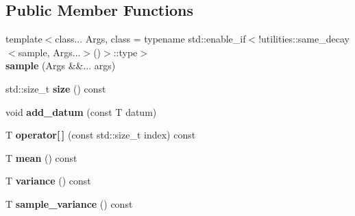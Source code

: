 \subsection*{Public Member Functions}
\begin{DoxyCompactItemize}
\item 
\mbox{\label{classsequoia_1_1statistics_1_1sample_3_01_t_00_010_01_4_a80c955beb3d1ac71708dd6588981c5a5}} 
{\footnotesize template$<$class... Args, class  = typename std\+::enable\+\_\+if$<$!utilities\+::same\+\_\+decay$<$sample, Args...$>$()$>$\+::type$>$ }\\{\bfseries sample} (Args \&\&... args)
\item 
\mbox{\label{classsequoia_1_1statistics_1_1sample_3_01_t_00_010_01_4_acaeb64b7c6ee90ea49c0515072277697}} 
std\+::size\+\_\+t {\bfseries size} () const
\item 
\mbox{\label{classsequoia_1_1statistics_1_1sample_3_01_t_00_010_01_4_ae31378f773e17c3745f0fb9e6da8f81a}} 
void {\bfseries add\+\_\+datum} (const T datum)
\item 
\mbox{\label{classsequoia_1_1statistics_1_1sample_3_01_t_00_010_01_4_ab6986245fd308b49515442391fabc7f2}} 
T {\bfseries operator\mbox{[}$\,$\mbox{]}} (const std\+::size\+\_\+t index) const
\item 
\mbox{\label{classsequoia_1_1statistics_1_1sample_3_01_t_00_010_01_4_af677a398b07e69de89e8343c5c472218}} 
T {\bfseries mean} () const
\item 
\mbox{\label{classsequoia_1_1statistics_1_1sample_3_01_t_00_010_01_4_a08edafba853f9c8db91395687d4a6956}} 
T {\bfseries variance} () const
\item 
\mbox{\label{classsequoia_1_1statistics_1_1sample_3_01_t_00_010_01_4_a3f99247cf2de1a01c35591afaa313c37}} 
T {\bfseries sample\+\_\+variance} () const
\item 

\end{DoxyCompactItemize}
